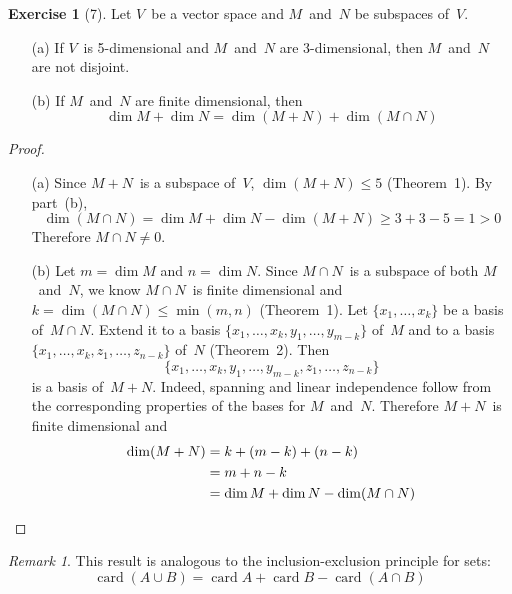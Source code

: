 \documentclass[letterpaper,12pt]{article}
\newcommand{\union}{\cup}
\newcommand{\sect}{\cap}
\DeclareMathOperator{\card}{card}
\theoremstyle{definition}
\newtheorem*{exer}{Exercise}
\theoremstyle{remark}
\newtheorem*{rmk}{Remark}
\theoremstyle{direction}
\begin{document}
\begin{exer}[7]
Let \(V\)~be a vector space and \(M\)~and~\(N\) be subspaces of~\(V\).
\begin{enumerate}
\item[(a)] If \(V\)~is 5-dimensional and \(M\)~and~\(N\) are 3-dimensional, then \(M\)~and~\(N\) are not disjoint.
\item[(b)] If \(M\)~and~\(N\) are finite dimensional, then
\[\dim M+\dim N=\dim(M+N)+\dim(M\sect N)\]
\end{enumerate}
\end{exer}
\begin{proof}\
\begin{enumerate}
\item[(a)] Since \(M+N\)~is a subspace of~\(V\), \(\dim(M+N)\le5\) (Theorem~1). By part~(b),
\[\dim(M\sect N)=\dim M+\dim N-\dim(M+N)\ge3+3-5=1>0\]
Therefore \(M\sect N\ne0\).
\item[(b)] Let \(m=\dim M\) and \(n=\dim N\). Since \(M\sect N\)~is a subspace of both \(M\)~and~\(N\), we know \(M\sect N\)~is finite dimensional and \(k=\dim(M\sect N)\le\min(m,n)\) (Theorem~1). Let \(\{x_1,\ldots,x_k\}\) be a basis of~\(M\sect N\). Extend it to a basis \(\{x_1,\ldots,x_k,y_1,\ldots,y_{m-k}\}\) of~\(M\) and to a basis \(\{x_1,\ldots,x_k,z_1,\ldots,z_{n-k}\}\) of~\(N\) (Theorem~2). Then
\[\{x_1,\ldots,x_k,y_1,\ldots,y_{m-k},z_1,\ldots,z_{n-k}\}\]
is a basis of~\(M+N\). Indeed, spanning and linear independence follow from the corresponding properties of the bases for \(M\)~and~\(N\). Therefore \(M+N\)~is finite dimensional and
\begin{align*}
\dim(M+N)&=k+(m-k)+(n-k)\\
	&=m+n-k\\
	&=\dim M+\dim N-\dim(M\sect N)\qedhere
\end{align*}
\end{enumerate}
\end{proof}
\begin{rmk}
This result is analogous to the inclusion-exclusion principle for sets:
\[\card(A\union B)=\card A+\card B-\card(A\sect B)\]
\end{rmk}
\end{document}
